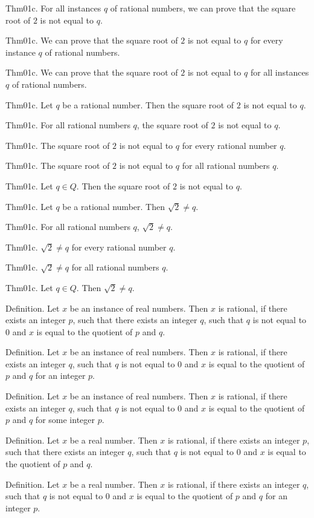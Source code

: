 \documentclass{article}
\begin{document}
Thm01c. For all instances $q$ of rational numbers, we can prove that the square root of $2$ is not equal to $q$.

Thm01c. We can prove that the square root of $2$ is not equal to $q$ for every instance $q$ of rational numbers.

Thm01c. We can prove that the square root of $2$ is not equal to $q$ for all instances $q$ of rational numbers.

Thm01c. Let $q$ be a rational number. Then the square root of $2$ is not equal to $q$.

Thm01c. For all rational numbers $q$, the square root of $2$ is not equal to $q$.

Thm01c. The square root of $2$ is not equal to $q$ for every rational number $q$.

Thm01c. The square root of $2$ is not equal to $q$ for all rational numbers $q$.

Thm01c. Let $q \in Q$. Then the square root of $2$ is not equal to $q$.

Thm01c. Let $q$ be a rational number. Then $\sqrt{ 2}\neq q$.

Thm01c. For all rational numbers $q$, $\sqrt{ 2}\neq q$.

Thm01c. $\sqrt{ 2}\neq q$ for every rational number $q$.

Thm01c. $\sqrt{ 2}\neq q$ for all rational numbers $q$.

Thm01c. Let $q \in Q$. Then $\sqrt{ 2}\neq q$.

Definition. Let $x$ be an instance of real numbers. Then $x$ is rational, if there exists an integer $p$, such that there exists an integer $q$, such that $q$ is not equal to $0$ and $x$ is equal to the quotient of $p$ and $q$.

Definition. Let $x$ be an instance of real numbers. Then $x$ is rational, if there exists an integer $q$, such that $q$ is not equal to $0$ and $x$ is equal to the quotient of $p$ and $q$ for an integer $p$.

Definition. Let $x$ be an instance of real numbers. Then $x$ is rational, if there exists an integer $q$, such that $q$ is not equal to $0$ and $x$ is equal to the quotient of $p$ and $q$ for some integer $p$.

Definition. Let $x$ be a real number. Then $x$ is rational, if there exists an integer $p$, such that there exists an integer $q$, such that $q$ is not equal to $0$ and $x$ is equal to the quotient of $p$ and $q$.

Definition. Let $x$ be a real number. Then $x$ is rational, if there exists an integer $q$, such that $q$ is not equal to $0$ and $x$ is equal to the quotient of $p$ and $q$ for an integer $p$.
\end{document}
